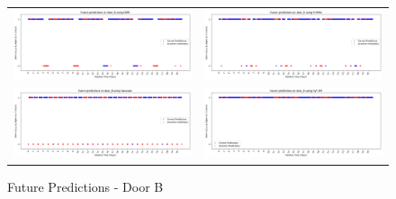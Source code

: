 \begin{figure}
  \begin{tabular}{cc}
    {\includegraphics[width = 3in]{images/results/Future_door_B_DMM.png}} &
    {\includegraphics[width = 3in]{images/results/Future_door_B_FreMEn.png}} \\
    {\includegraphics[width = 3in]{images/results/Future_door_B_Gaussian.png}} &
    {\includegraphics[width = 3in]{images/results/Future_door_B_HyT-EM.png}} \\
  \end{tabular}
  \caption{Future Predictions - Door B}
\end{figure}\\ \\

